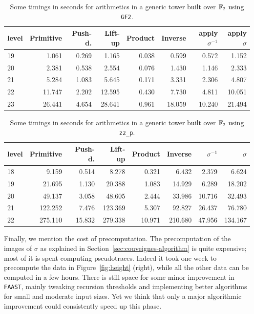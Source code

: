 \begin{table}
  \centering
  \begin{tabular}{l | r | r | r | r | r | r | r}
    \small level & \small Primitive & \small Push-d. & \small Lift-up & \small Product & \small Inverse & \small apply $\sigma^{-1}$ & \small apply $\sigma$ \\
    \hline
     19 &  1.061 & 0.269 &  1.165 & 0.038 &  0.599 &  0.572 &  1.152\\
     20 &  2.381 & 0.538 &  2.554 & 0.076 &  1.430 &  1.146 &  2.333\\
     21 &  5.284 & 1.083 &  5.645 & 0.171 &  3.331 &  2.306 &  4.807\\
     22 & 11.747 & 2.202 & 12.595 & 0.430 &  7.730 &  4.811 & 10.051\\
     23 & 26.441 & 4.654 & 28.641 & 0.961 & 18.059 & 10.240 & 21.494\\
  \end{tabular}
  \caption{Some timings in seconds for arithmetics in a generic tower built over $\mathbb{F}_2$ using \texttt{GF2}.}
  \label{tab:arith-gf2}
\end{table}

\begin{table}
  \centering
  \begin{tabular}{l | r | r | r | r | r | r | r}
    \small level & \small Primitive & \small Push-d. & \small Lift-up & \small Product & \small Inverse & \small $\sigma^{-1}$ & \small  $\sigma$ \\
    \hline
    18 &   9.159 &  0.514 &   8.278 &  0.321 &   6.432 &  2.379 &   6.624\\
    19 &  21.695 &  1.130 &  20.388 &  1.083 &  14.929 &  6.289 &  18.202\\
    20 &  49.137 &  3.058 &  48.605 &  2.444 &  33.986 & 10.716 &  32.493\\
    21 & 122.252 &  7.476 & 123.369 &  5.307 &  92.827 & 26.437 &  76.780\\
    22 & 275.110 & 15.832 & 279.338 & 10.971 & 210.680 & 47.956 & 134.167\\
  \end{tabular}
  \caption{Some timings in seconds for arithmetics in a generic tower built over $\mathbb{F}_2$ using \texttt{zz\_p}.}
  \label{tab:arith-zzp}
\end{table}


Finally, we mention the cost of precomputation. The precomputation of
the images of $\sigma$ as explained in
Section~\ref{sec:couveignes-algorithm} is quite expensive; most of it
is spent computing pseudotraces. Indeed it took one week to precompute
the data in Figure~\ref{fig:height} (right), while all the other data
can be computed in a few hours. There is still space for some minor
improvement in \texttt{FAAST}, mainly tweaking recursion thresholds
and implementing better algorithms for small and moderate input
sizes. Yet we think that only a major algorithmic improvement could
consistently speed up this phase.



%
